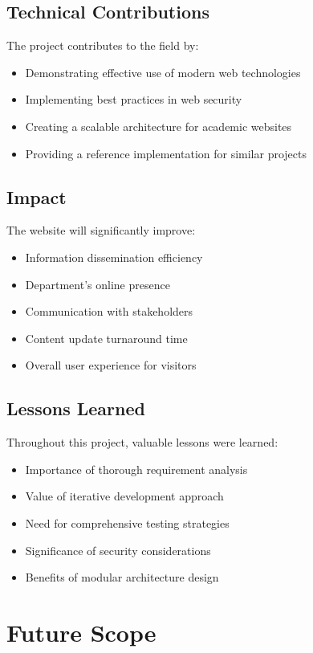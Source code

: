 \documentclass[12pt,a4paper]{report}
\begin{document}
\section{Technical Contributions}
The project contributes to the field by:
\begin{itemize}
    \item Demonstrating effective use of modern web technologies
    \item Implementing best practices in web security
    \item Creating a scalable architecture for academic websites
    \item Providing a reference implementation for similar projects
\end{itemize}

\section{Impact}
The website will significantly improve:
\begin{itemize}
    \item Information dissemination efficiency
    \item Department's online presence
    \item Communication with stakeholders
    \item Content update turnaround time
    \item Overall user experience for visitors
\end{itemize}

\section{Lessons Learned}
Throughout this project, valuable lessons were learned:
\begin{itemize}
    \item Importance of thorough requirement analysis
    \item Value of iterative development approach
    \item Need for comprehensive testing strategies
    \item Significance of security considerations
    \item Benefits of modular architecture design
\end{itemize}

\chapter{Future Scope}
\label{chap:future}
\end{document}
